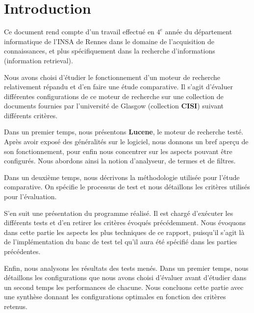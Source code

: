 \section{Introduction}

Ce document rend compte d’un travail effectué en $4^{e}$ année du département informatique de l’INSA de Rennes dans le domaine de l’acquisition de connaissances, et plus spécifiquement dans la recherche d’informations (information retrieval).

Nous avons choisi d’étudier le fonctionnement d’un moteur de recherche relativement répandu et d’en faire une étude comparative. Il s’agit d’évaluer différentes configurations de ce moteur de recherche sur une collection de documents fournies par l’université de Glasgow (collection \textbf{CISI}) suivant différents critères.

Dans un premier temps, nous présentons \textbf{Lucene}, le moteur de recherche testé. Après avoir exposé des généralités sur le logiciel, nous donnons un bref aperçu de son fonctionnement, pour enfin nous concentrer sur les aspects pouvant être configurés. Nous abordons ainsi la notion d’analyseur, de termes et de filtres.

Dans un deuxième temps, nous décrivons la méthodologie utilisée pour l’étude comparative. On spécifie le processus de test et nous détaillons les critères utilisés pour l’évaluation.

S’en suit une présentation du programme réalisé. Il est chargé d’exécuter les différents tests et d’en retirer les critères évoqués précédemment. Nous évoquons dans cette partie les aspects les plus techniques de ce rapport, puisqu’il s’agit là de l’implémentation du banc de test tel qu’il aura été spécifié dans les parties précédentes.

Enfin, nous analysons les résultats des tests menés. Dans un premier temps, nous détaillons les configurations que nous avons choisi d’évaluer avant d’étudier dans un second temps les performances de chacune. Nous concluons cette partie avec une synthèse donnant les configurations optimales en fonction des critères retenus.

























